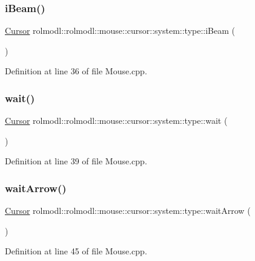 \subsubsection{\texorpdfstring{iBeam()}{iBeam()}}
{\footnotesize\ttfamily \mbox{\hyperlink{classrolmodl_1_1rolmodl_1_1mouse_1_1_cursor}{Cursor}} rolmodl\+::rolmodl\+::mouse\+::cursor\+::system\+::type\+::i\+Beam (\begin{DoxyParamCaption}{ }\end{DoxyParamCaption})}



Definition at line 36 of file Mouse.\+cpp.

\mbox{\label{namespacerolmodl_1_1rolmodl_1_1mouse_1_1cursor_1_1system_1_1type_adb5cf14ee167497464c3518e28306091}} 
\subsubsection{\texorpdfstring{wait()}{wait()}}
{\footnotesize\ttfamily \mbox{\hyperlink{classrolmodl_1_1rolmodl_1_1mouse_1_1_cursor}{Cursor}} rolmodl\+::rolmodl\+::mouse\+::cursor\+::system\+::type\+::wait (\begin{DoxyParamCaption}{ }\end{DoxyParamCaption})}



Definition at line 39 of file Mouse.\+cpp.

\mbox{\label{namespacerolmodl_1_1rolmodl_1_1mouse_1_1cursor_1_1system_1_1type_abf1a637ca122c5442c53e0d1cc82e091}} 
\subsubsection{\texorpdfstring{waitArrow()}{waitArrow()}}
{\footnotesize\ttfamily \mbox{\hyperlink{classrolmodl_1_1rolmodl_1_1mouse_1_1_cursor}{Cursor}} rolmodl\+::rolmodl\+::mouse\+::cursor\+::system\+::type\+::wait\+Arrow (\begin{DoxyParamCaption}{ }\end{DoxyParamCaption})}



Definition at line 45 of file Mouse.\+cpp.


